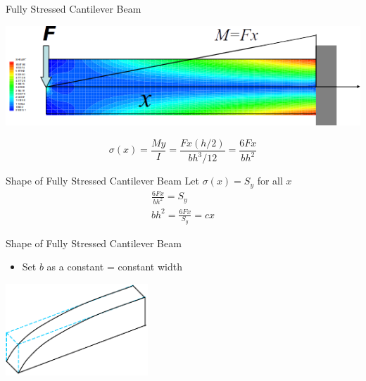 \documentclass[10pt, svgnames]{beamer}
\begin{document}
\begin{frame}[label={sec:org4fe7395}]{Fully Stressed Cantilever Beam}
\begin{center}
\includegraphics[width=.9\linewidth]{./pictures/fea-fully-stressed-beam-analysis.png}
\end{center}

\begin{equation*}
  \sigma(x) = \frac{My}{I} = \frac{Fx(h/2)}{bh^3/12} = \frac{6Fx}{bh^2}
\end{equation*}
\end{frame}

\begin{frame}[label={sec:org8021b01}]{Shape of Fully Stressed Cantilever Beam}
Let \(\sigma(x) = S_y\) for all \(x\)
\begin{gather*}
  \frac{6Fx}{bh^2} = S_y \\
  bh^2 = \frac{6Fx}{S_y} = cx
\end{gather*}
\end{frame}

\begin{frame}[label={sec:orgeef5237}]{Shape of Fully Stressed Cantilever Beam}
\begin{itemize}
\item Set \(b\) as a constant = constant width
\end{itemize}

\includegraphics[width=0.4\textwidth]{pictures/fully-stressed-parabola}
\end{frame}
\end{document}
